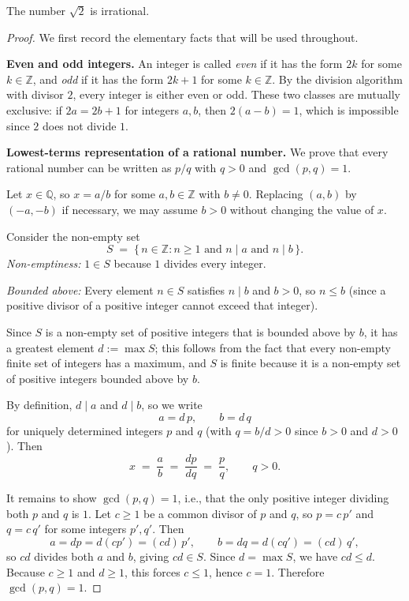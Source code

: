\begin{theorem}
The number $\sqrt{2}$ is irrational.
\end{theorem}

\begin{proof}
We first record the elementary facts that will be used throughout.

\medskip
\noindent\textbf{Even and odd integers.}
An integer is called \emph{even} if it has the form $2k$ for some $k\in\mathbb{Z}$, and \emph{odd} if it has the form $2k+1$ for some $k\in\mathbb{Z}$. By the division algorithm with divisor $2$, every integer is either even or odd. These two classes are mutually exclusive: if $2a=2b+1$ for integers $a,b$, then $2(a-b)=1$, which is impossible since $2$ does not divide $1$.

\medskip
\noindent\textbf{Lowest-terms representation of a rational number.}
We prove that every rational number can be written as $p/q$ with $q>0$ and $\gcd(p,q)=1$.

Let $x\in\mathbb{Q}$, so $x=a/b$ for some $a,b\in\mathbb{Z}$ with $b\neq 0$. Replacing $(a,b)$ by $(-a,-b)$ if necessary, we may assume $b>0$ without changing the value of $x$.

Consider the non-empty set
\[
S \;=\; \{\, n\in\mathbb{Z} : n\geq 1 \text{ and } n\mid a \text{ and } n\mid b\,\}.
\]
\emph{Non-emptiness:} $1\in S$ because $1$ divides every integer.

\emph{Bounded above:} Every element $n\in S$ satisfies $n\mid b$ and $b>0$, so $n\leq b$ (since a positive divisor of a positive integer cannot exceed that integer).

Since $S$ is a non-empty set of positive integers that is bounded above by $b$, it has a greatest element $d:=\max S$; this follows from the fact that every non-empty finite set of integers has a maximum, and $S$ is finite because it is a non-empty set of positive integers bounded above by $b$.

By definition, $d\mid a$ and $d\mid b$, so we write
\[
a = d\,p,\qquad b = d\,q
\]
for uniquely determined integers $p$ and $q$ (with $q = b/d > 0$ since $b > 0$ and $d > 0$). Then
\[
x \;=\; \frac{a}{b} \;=\; \frac{dp}{dq} \;=\; \frac{p}{q}, \qquad q > 0.
\]

It remains to show $\gcd(p,q)=1$, i.e., that the only positive integer dividing both $p$ and $q$ is $1$. Let $c\geq 1$ be a common divisor of $p$ and $q$, so $p=c\,p'$ and $q=c\,q'$ for some integers $p',q'$. Then
\[
a = dp = d(cp') = (cd)\,p', \qquad b = dq = d(cq') = (cd)\,q',
\]
so $cd$ divides both $a$ and $b$, giving $cd\in S$. Since $d = \max S$, we have $cd\leq d$. Because $c\geq 1$ and $d\geq 1$, this forces $c\leq 1$, hence $c=1$. Therefore $\gcd(p,q)=1$.


\end{proof}
